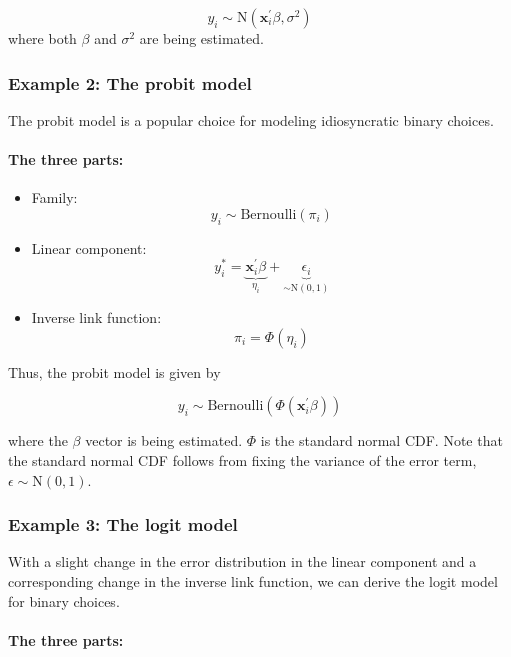 \documentclass[
  11pt,
]{article}
\providecommand{\tightlist}{%
  \setlength{\itemsep}{0pt}\setlength{\parskip}{0pt}}
\begin{document}
\[y_i \sim \text{N}(\mathbf{x}_i^{\prime} \beta, \sigma^2)\]
where both \(\beta\) and \(\sigma^2\) are being estimated.

\hypertarget{example-2-the-probit-model}{%
\subsubsection{Example 2: The probit model}\label{example-2-the-probit-model}}

The probit model is a popular choice for modeling idiosyncratic binary choices.

\hypertarget{the-three-parts-1}{%
\paragraph{The three parts:}\label{the-three-parts-1}}

\begin{itemize}
\tightlist
\item
  Family: \[y_i \sim \text{Bernoulli}(\pi_i)\]
\item
  Linear component: \[y_i^{\ast} = \underbrace{\mathbf{x}_i^{\prime} \beta}_{\eta_i} + \underbrace{\epsilon_i}_{\sim \text{N}(0, 1)}\]
\item
  Inverse link function: \[\pi_i = \Phi(\eta_i)\]
\end{itemize}

Thus, the probit model is given by

\[y_i \sim \text{Bernoulli}(\Phi(\mathbf{x}_i^{\prime} \beta))\]

where the \(\beta\) vector is being estimated. \(\Phi\) is the standard normal CDF. Note that the standard normal CDF follows from fixing the variance of the error term, \(\epsilon \sim \text{N}(0, 1)\).

\hypertarget{example-3-the-logit-model}{%
\subsubsection{Example 3: The logit model}\label{example-3-the-logit-model}}

With a slight change in the error distribution in the linear component and a corresponding change in the inverse link function, we can derive the logit model for binary choices.

\hypertarget{the-three-parts-2}{%
\paragraph{The three parts:}\label{the-three-parts-2}}
\end{document}
